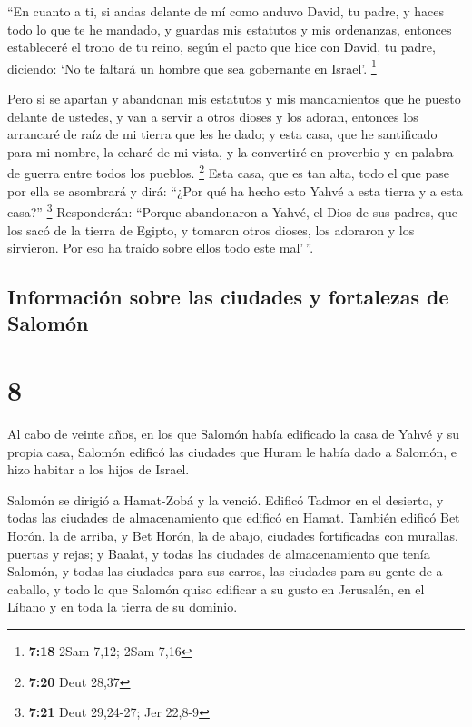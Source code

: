  ``En cuanto a ti, si andas delante de mí como anduvo
David, tu padre, y haces todo lo que te he mandado, y guardas mis
estatutos y mis ordenanzas,  entonces estableceré el
trono de tu reino, según el pacto que hice con David, tu padre,
diciendo: `No te faltará un hombre que sea gobernante en Israel'.
\footnote{\textbf{7:18} 2Sam 7,12; 2Sam 7,16}

 Pero si se apartan y abandonan mis estatutos y mis
mandamientos que he puesto delante de ustedes, y van a servir a otros
dioses y los adoran,  entonces los arrancaré de raíz de
mi tierra que les he dado; y esta casa, que he santificado para mi
nombre, la echaré de mi vista, y la convertiré en proverbio y en palabra
de guerra entre todos los pueblos. \footnote{\textbf{7:20} Deut 28,37}
 Esta casa, que es tan alta, todo el que pase por ella se
asombrará y dirá: ``¿Por qué ha hecho esto Yahvé a esta tierra y a esta
casa?'' \footnote{\textbf{7:21} Deut 29,24-27; Jer 22,8-9}
 Responderán: ``Porque abandonaron a Yahvé, el Dios de
sus padres, que los sacó de la tierra de Egipto, y tomaron otros dioses,
los adoraron y los sirvieron. Por eso ha traído sobre ellos todo este
mal'\,''.

\hypertarget{informaciuxf3n-sobre-las-ciudades-y-fortalezas-de-salomuxf3n}{%
\subsection{Información sobre las ciudades y fortalezas de
Salomón}\label{informaciuxf3n-sobre-las-ciudades-y-fortalezas-de-salomuxf3n}}

\hypertarget{section-7}{%
\section{8}\label{section-7}}

 Al cabo de veinte años, en los que Salomón había
edificado la casa de Yahvé y su propia casa,  Salomón
edificó las ciudades que Huram le había dado a Salomón, e hizo habitar a
los hijos de Israel.

 Salomón se dirigió a Hamat-Zobá y la venció.
 Edificó Tadmor en el desierto, y todas las ciudades de
almacenamiento que edificó en Hamat.  También edificó Bet
Horón, la de arriba, y Bet Horón, la de abajo, ciudades fortificadas con
murallas, puertas y rejas;  y Baalat, y todas las ciudades
de almacenamiento que tenía Salomón, y todas las ciudades para sus
carros, las ciudades para su gente de a caballo, y todo lo que Salomón
quiso edificar a su gusto en Jerusalén, en el Líbano y en toda la tierra
de su dominio.

